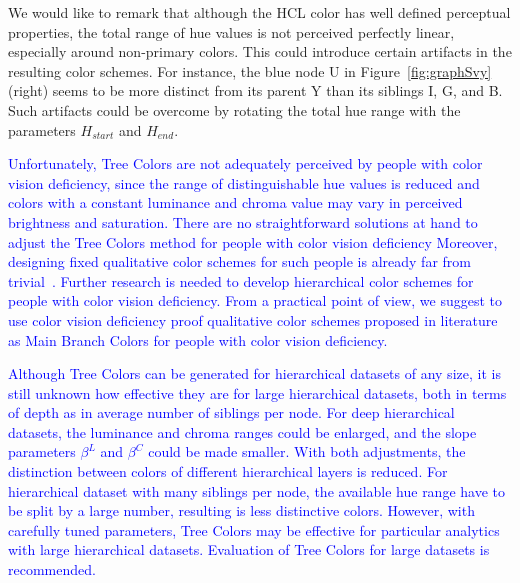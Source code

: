 \documentclass[journal]{vgtc}                %
\newcommand{\changedM}[1]{\textcolor{blue}{#1}}
\begin{document}
We would like to remark that although the HCL color has well defined perceptual properties, the total range of hue values is not perceived perfectly linear, especially around non-primary colors. This could introduce certain artifacts in the resulting color schemes. For instance, the blue node U in Figure~\ref{fig:graphSvy} (right) seems to be more distinct from its parent Y than its siblings I, G, and B. Such artifacts could be overcome by rotating the total hue range with the parameters $H_{start}$ and $H_{end}$.

\changedM{Unfortunately, Tree Colors are not adequately perceived by people with color vision deficiency, since the range of distinguishable hue values is reduced and colors with a constant luminance and chroma value may vary in perceived brightness and saturation. There are no straightforward solutions at hand to adjust the Tree Colors method for people with color vision deficiency Moreover, designing fixed qualitative color schemes for such people is already far from trivial~\cite{okabe02}. Further research is needed to develop hierarchical color schemes for people with color vision deficiency. From a practical point of view, we suggest to use color vision deficiency proof qualitative color schemes proposed in literature~\cite{okabe02, brewer03} as Main Branch Colors for people with color vision deficiency.}

\changedM{Although Tree Colors can be generated for hierarchical datasets of any size, it is still unknown how effective they are for large hierarchical datasets, both in terms of depth as in average number of siblings per node. For deep hierarchical datasets, the luminance and chroma ranges could be enlarged, and the slope parameters $\beta^{L}$ and $\beta^{C}$ could be made smaller. With both adjustments, the distinction between colors of different hierarchical layers is reduced. For hierarchical dataset with many siblings per node, the available hue range have to be split by a large number, resulting is less distinctive colors. However, with carefully tuned parameters, Tree Colors may be effective for particular analytics with large hierarchical datasets. Evaluation of Tree Colors for large datasets is recommended.}





\end{document}
